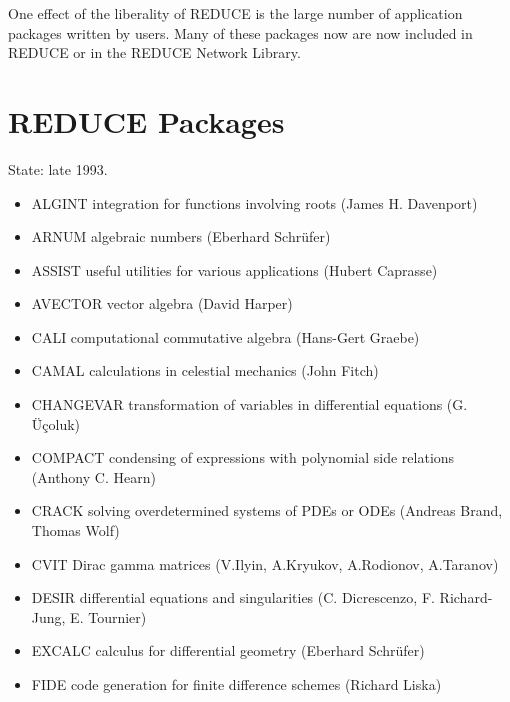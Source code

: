 One effect of the liberality of {\small REDUCE} is the large number of
application packages written by users.  Many of these packages now are now
included in {\small REDUCE} or in the {\small REDUCE} Network Library.
\renewcommand{\thesection}{Appendix \Alph{section}}
\setcounter{section}{0}

\section{REDUCE Packages}
 
State: late 1993.
 
\begin{itemize}
\item ALGINT integration for functions involving roots
(James H. Davenport)
 
\item ARNUM  algebraic numbers (Eberhard Schr\"ufer)
 
\item ASSIST  useful utilities for various applications (Hubert Caprasse)

\item AVECTOR vector algebra (David Harper)
 
\item CALI  computational commutative algebra (Hans-Gert Graebe)

\item CAMAL  calculations in celestial mechanics (John Fitch)

\item CHANGEVAR transformation of variables in differential equations
(G. \"{U}\c{c}oluk)

\item COMPACT condensing of expressions with polynomial side relations
        (Anthony C. Hearn)
 
\item CRACK solving overdetermined systems of PDEs or ODEs
(Andreas Brand, Thomas Wolf)

\item CVIT Dirac gamma matrices (V.Ilyin, A.Kryukov, A.Rodionov,
         A.Taranov)

\item DESIR differential equations and singularities 
(C. Dicrescenzo, F. Richard-Jung, E. Tournier)

\item EXCALC  calculus for differential geometry (Eberhard Schr\"ufer)
 
\item FIDE code generation for finite difference schemes
(Richard Liska)


\end{itemize}
